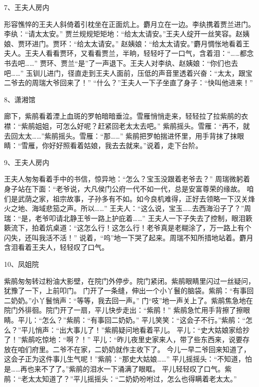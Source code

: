7、王夫人房内\par
形容憔悴的王夫人斜倚着引枕坐在正面炕上。麝月立在一边。李纨携着贾兰进门。李纨：“请太太安。”
贾兰规规矩矩地：“给太太请安。”王夫人绽开一丝笑容。赵姨娘、贾环进门。贾环：“给太太请安。” 
赵姨娘：“给太太请安。”麝月惆怅地看着王夫人。王夫人看看贾环，又看看贾兰，半晌，轻轻吁了一口气，含着泪：“……都念书去吧……”
贾环、贾兰“是”了一声退下。王夫人对李纨、赵姨娘：“你们也去吧……” 
玉钏儿进门，径直走到王夫人面前，压低的声音里透着兴奋：“太太，跟宝二爷去的周瑞大爷回来了！” 
“什么？”王夫人一下子坐直了身子：“快叫他进来！” 

8、潇湘馆\par

廊下，紫鹃看着湮上血斑的罗帕暗暗垂泣。雪雁悄悄走来，轻轻拉了拉紫鹃的衣襟：“紫鹃姐姐，可怎么好呢？赶紧回老太太去吧。” 
紫鹃摇头。雪雁：“再不，就去回太太……”紫鹃摇头。雪雁：“那……” 
紫鹃把罗帕揣进怀里，用手背抹了抹眼睛：“雪雁，你好好照看着姑娘，我去去就来。”说着，走下台阶。 

9、王夫人房内\par
王夫人匆匆看着手中的书信，惊异地：“怎么？宝玉没跟着老爷去？” 
周瑞微躬着身子站在下面：“老爷说，大凡侯门公府一代不如一代，总是安富尊荣的缘故。
咱们是武荫之家，祖宗故事，子孙多有不如。如今良机难得，正好去领略一下汉关烽火之地、海域悲笳之声。所以……” 
王夫人：“这么说，宝玉……去西海沿子了？”周瑞：“是，老爷叩请北静王爷一路上护庇着……”
王夫人一下子失去了控制，眼泪簌簌流下，拍着炕桌道：“这怎么行！这怎么行！老爷真是老糊涂了，万一路上有个闪失，还叫我活不活！”
说着，“呜”地一下哭了起来。周瑞不知所措地站着。麝月含泪看着王夫人，轻轻叹了口气。

10、凤姐院\par
紫鹃匆匆转过粉油大影壁，在院门外停步。院门紧闭。紫鹃眼睛里闪过一丝疑问，犹豫了一下，上前叩门。 
门开了一条缝，伸出一个小丫鬟的脑袋。紫鹃：“有事回二奶奶。”小丫鬟悄声：“等等，我去回一声。” 
门“吱”地一声关上了。紫鹃焦急地在院门外徘徊。院门开了一扇，平儿快步走出：“紫鹃！”
紫鹃急忙用手背擦了擦眼睛。平儿：“怎么？”紫鹃：“有事回二奶奶。” 
平儿笑笑：“这会子不行。”紫鹃：“怎么？”平儿悄声：“出大事儿了！”紫鹃疑问地看着平儿。 
平儿：“史大姑娘家给抄了！”紫鹃吃惊地：“啊？！” 
平儿：“昨儿夜里史家来人，带了些东西来，说要存放在咱们府里。二爷不在家，二奶奶就作主收下了。
今儿一早二爷回来知道了，这会子正为这件事儿生气呢！”紫鹃：“那史大姑娘……”
平儿摇摇头：“不知道，怕是……再也来不了了。”紫鹃的泪水一下涌满了眼眶。 
平儿轻轻叹了口气。紫鹃：“老太太知道了？”平儿摇摇头：“二奶奶吩咐过，怎么也得瞒着老太太。”

